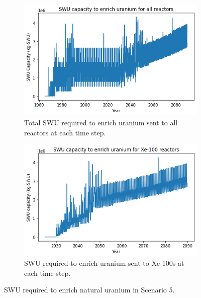 \documentclass[preprint]{elsarticle}
\providecommand{\DIFaddbeginFL}{} %
\providecommand{\DIFaddendFL}{} %
\providecommand{\DIFdelbeginFL}{} %
\providecommand{\DIFdelendFL}{} %
\begin{document}
\begin{figure}
    \centering
    \DIFdelbeginFL %
\DIFdelendFL \DIFaddbeginFL \begin{subfigure}{0.45\textwidth}
        \DIFaddendFL \centering
        \DIFdelbeginFL %
\DIFdelendFL \DIFaddbeginFL \includegraphics[scale=0.4]{../figures/totalswu_scenarios_5.png}
        \DIFaddendFL \caption{Total \gls{SWU} required to enrich uranium sent to all reactors at each time step.}
        \label{fig:totalswu_5}
    \end{subfigure}
    \hspace{0.8cm}
    \DIFdelbeginFL %
\DIFdelendFL \DIFaddbeginFL \begin{subfigure}{0.45\textwidth}
        \DIFaddendFL \centering
        \DIFdelbeginFL %
\DIFdelendFL \DIFaddbeginFL \includegraphics[scale=0.4]{../figures/haleuSWU_scenarios_5.png}
        \DIFaddendFL \caption{\gls{SWU} required to enrich uranium sent to Xe-100s at each time step.}
        \label{fig:haleuswu_5}
    \end{subfigure}
    \caption{\gls{SWU} required to enrich natural uranium in Scenario 5.}
    \label{fig:swu_5}
\end{figure}
\end{document}

